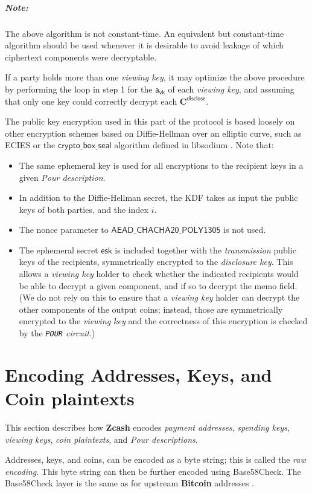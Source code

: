 \documentclass{article}
\newcommand{\term}[1]{\textsl{#1}\xspace}
\newcommand{\termbf}[1]{\textbf{#1}\xspace}
\newcommand{\Zcash}{\termbf{Zcash}}
\newcommand{\Bitcoin}{\termbf{Bitcoin}}
\newcommand{\PourDescription}{\term{Pour description}}
\newcommand{\PourDescriptions}{\term{Pour descriptions}}
\newcommand{\paymentAddresses}{\term{payment addresses}}
\newcommand{\viewingKey}{\term{viewing key}}
\newcommand{\viewingKeys}{\term{viewing keys}}
\newcommand{\spendingKeys}{\term{spending keys}}
\newcommand{\coinPlaintexts}{\term{coin plaintexts}}
\newcommand{\transmitKeypair}{\term{transmission}}
\newcommand{\discloseKey}{\term{disclosure key}}
\newcommand{\DiscloseKey}{\mathsf{a_{vk}}}
\newcommand{\disclose}{\mathsf{disclose}}
\newcommand{\EphemeralPrivate}{\mathsf{esk}}
\newcommand{\Ciphertext}{\mathbf{C}}
\newcommand{\DiscloseCiphertext}[1]{\Ciphertext^\disclose_{#1}}
\newcommand{\SymSpecific}{\mathsf{AEAD\_CHACHA20\_POLY1305}}
\newcommand{\CryptoBoxSeal}{\mathsf{crypto\_box\_seal}}
\newcommand{\PourCircuit}{\term{\texttt{POUR} circuit}}
\begin{document}
{\subparagraph{Note:}
The above algorithm is not constant-time. An equivalent but constant-time algorithm
should be used whenever it is desirable to avoid leakage of which ciphertext
components were decryptable.

If a party holds more than one \viewingKey, it may optimize the above
procedure by performing the loop in step 1 for the $\DiscloseKey{}$ of each
\viewingKey, and assuming that only one key could correctly decrypt each
$\DiscloseCiphertext{}$.

The public key encryption used in this part of the protocol is based loosely on
other encryption schemes based on Diffie-Hellman over an elliptic curve, such
as ECIES or the $\CryptoBoxSeal$ algorithm defined in libsodium \cite{cryptoboxseal}.
Note that:
\begin{itemize}
  \item The same ephemeral key is used for all encryptions to the recipient keys
        in a given \PourDescription.
  \item In addition to the Diffie-Hellman secret, the KDF takes as input the
        public keys of both parties, and the index $i$.
  \item The nonce parameter to $\SymSpecific$ is not used.
  \item The ephemeral secret $\EphemeralPrivate$ is included together with
        the \transmitKeypair public keys of the recipients, symmetrically
        encrypted to the \discloseKey.
        This allows a \viewingKey holder to check whether the
        indicated recipients would be able to decrypt a given component, and
        if so to decrypt the memo field. (We do not rely on this to ensure
        that a \viewingKey holder can decrypt the other components of the
        output coins; instead, those are symmetrically encrypted to the
        \viewingKey and the correctness of this encryption is checked by the
        \PourCircuit.)
\end{itemize}
}


\section{Encoding Addresses, Keys, and Coin plaintexts}

This section describes how \Zcash encodes \paymentAddresses, \spendingKeys,
\viewingKeys, \coinPlaintexts, and \PourDescriptions.

Addresses, keys, and coins, can be encoded as a byte string; this is called
the \term{raw encoding}. This byte string can then be further encoded using
Base58Check. The Base58Check layer is the same as for upstream \Bitcoin
addresses \cite{Base58Check}.
\end{document}
